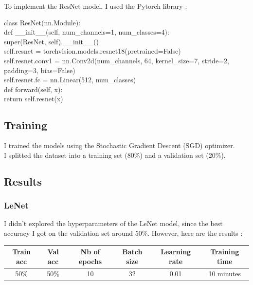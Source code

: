 \documentclass[12pt,a4paper]{article}
\newcommand{\code}[1]{%
    \begin{tcolorbox}[colback=black!10!white,colframe=black]
        #1
    \end{tcolorbox}
}
\begin{document}
To implement the ResNet model, I used the Pytorch library :

\code{
    class ResNet(nn.Module):\\
    \indent\qquad def \_\_init\_\_(self, num\_channels=1, num\_classes=4): \\
    \indent\qquad \qquad super(ResNet, self).\_\_init\_\_() \\
    \indent\qquad \qquad self.resnet = torchvision.models.resnet18(pretrained=False) \\
    \indent\qquad \qquad self.resnet.conv1 = nn.Conv2d(num\_channels, 64, kernel\_size=7, stride=2, padding=3, bias=False) \\
    \indent\qquad \qquad self.resnet.fc = nn.Linear(512, num\_classes) \\
    
    \indent\qquad def forward(self, x): \\
    \indent\qquad \qquad return self.resnet(x)
}

\subsection{Training}

I trained the models using the Stochastic Gradient Descent (SGD) optimizer. \\
I splitted the dataset into a training set (80\%) and a validation set (20\%).


\subsection{Results}

\subsubsection{LeNet}

I didn't explored the hyperparameters of the LeNet model, since the best accuracy I got on the validation set around 50\%.
However, here are the results :\\

\begin{tabular}{|c|c|c|c|c|c|}
    \hline
    \textbf{Train acc} & \textbf{Val acc} & \textbf{Nb of epochs} & \textbf{Batch size} & \textbf{Learning rate} & \textbf{Training time} \\
    \hline
    50\% & 50\% & 10 & 32 & 0.01 & 10 minutes \\
    \hline    
\end{tabular}\\
\end{document}
